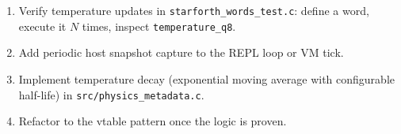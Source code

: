 \begin{enumerate}
  \item Verify temperature updates in \texttt{starforth\_words\_test.c}:
        define a word, execute it $N$ times, inspect \texttt{temperature\_q8}.
  \item Add periodic host snapshot capture to the REPL loop or VM tick.
  \item Implement temperature decay (exponential moving average with
        configurable half-life) in \texttt{src/physics\_metadata.c}.
  \item Refactor to the vtable pattern once the logic is proven.
\end{enumerate}
